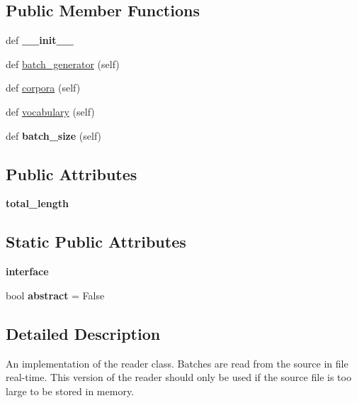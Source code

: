 \subsection*{Public Member Functions}
\begin{DoxyCompactItemize}
\item 
def {\bfseries \+\_\+\+\_\+init\+\_\+\+\_\+}\hypertarget{classreader_1_1FileInput_ac55aca52bf20b456d851b5adbff7527c}{}\label{classreader_1_1FileInput_ac55aca52bf20b456d851b5adbff7527c}

\item 
def \hyperlink{classreader_1_1FileInput_a4c046bc14dbe751723b2c8eb89acadb3}{batch\+\_\+generator} (self)
\item 
def \hyperlink{classreader_1_1FileInput_aa0bd1d475c34b6c1a696c64cfec375b8}{corpora} (self)
\item 
def \hyperlink{classreader_1_1FileInput_a63f0002ffa0e5e0b246de6643f0212c9}{vocabulary} (self)
\item 
def {\bfseries batch\+\_\+size} (self)\hypertarget{classreader_1_1FileInput_a6d2a492f373b240018c33e0d363c6455}{}\label{classreader_1_1FileInput_a6d2a492f373b240018c33e0d363c6455}

\end{DoxyCompactItemize}
\subsection*{Public Attributes}
\begin{DoxyCompactItemize}
\item 
{\bfseries total\+\_\+length}\hypertarget{classreader_1_1FileInput_ab677e698bac6d1216f86597a2fadde74}{}\label{classreader_1_1FileInput_ab677e698bac6d1216f86597a2fadde74}

\end{DoxyCompactItemize}
\subsection*{Static Public Attributes}
\begin{DoxyCompactItemize}
\item 
{\bfseries interface}
\item 
bool {\bfseries abstract} = False\hypertarget{classreader_1_1FileInput_aeee47af24e6fee5ffa7621eab9888cff}{}\label{classreader_1_1FileInput_aeee47af24e6fee5ffa7621eab9888cff}

\end{DoxyCompactItemize}


\subsection{Detailed Description}
\begin{DoxyVerb}An implementation of the reader class. Batches are read from the source in file real-time.
This version of the reader should only be used if the source file is too large to be stored
in memory.
\end{DoxyVerb}
 

